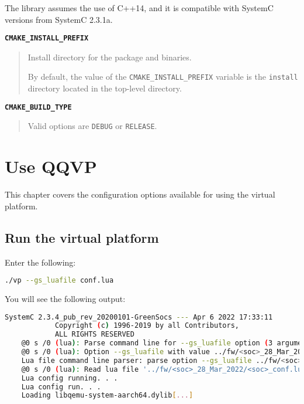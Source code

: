 The library assumes the use of C++14, and it is compatible with SystemC versions from SystemC 2.3.1a.

{\textbf {\footnotesize{\lstinline!CMAKE_INSTALL_PREFIX!}}}
\begin{quote}
Install directory for the package and binaries.

By default, the value of the {\small{\lstinline!CMAKE_INSTALL_PREFIX!}} variable is the {\small{\lstinline!install!}} directory located in the top-level directory.
\end{quote}

{\textbf {\footnotesize{\lstinline!CMAKE_BUILD_TYPE!}}}
\begin{quote}
Valid options are {\small{\lstinline!DEBUG!}} or {\small{\lstinline!RELEASE!}}.
\end{quote}



\chapter{Use QQVP}

This chapter covers the configuration options available for using the virtual platform.


\section{Run the virtual platform}

Enter the following:

\small
\begin{lstlisting}[language=bash]
    ./vp --gs_luafile conf.lua
\end{lstlisting}
\normalsize

You will see the following output:

\small
\begin{lstlisting}[language=bash]
            SystemC 2.3.4_pub_rev_20200101-GreenSocs --- Apr 6 2022 17:33:11
            Copyright (c) 1996-2019 by all Contributors,
            ALL RIGHTS RESERVED
    @0 s /0 (lua): Parse command line for --gs_luafile option (3 arguments)
    @0 s /0 (lua): Option --gs_luafile with value ../fw/<soc>_28_Mar_2022/<soc>_conf.lua
    Lua file command line parser: parse option --gs_luafile ../fw/<soc>_28_Mar_2022/<soc>_conf.lua
    @0 s /0 (lua): Read lua file '../fw/<soc>_28_Mar_2022/<soc>_conf.lua'
    Lua config running. . .
    Lua config run. . .
    Loading libqemu-system-aarch64.dylib[...]
\end{lstlisting}
\normalsize



